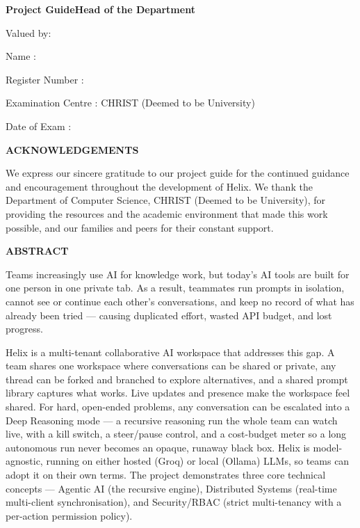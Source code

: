 \documentclass[12pt,a4paper]{report}
\begin{document}
\vspace{0.5in}

\noindent\textbf{Project Guide}\hfill\textbf{Head of the Department}
\vspace{0.4in}

Valued by:

Name :

Register Number :

Examination Centre : CHRIST (Deemed to be University)

Date of Exam :

\clearpage
\begin{center}{\fontsize{16}{19}\selectfont\bfseries ACKNOWLEDGEMENTS}\end{center}

We express our sincere gratitude to our project guide for the continued guidance and encouragement throughout the development of Helix. We thank the Department of Computer Science, CHRIST (Deemed to be University), for providing the resources and the academic environment that made this work possible, and our families and peers for their constant support.

\clearpage
\begin{center}{\fontsize{16}{19}\selectfont\bfseries ABSTRACT}\end{center}

Teams increasingly use AI for knowledge work, but today's AI tools are built for one person in one private tab. As a result, teammates run prompts in isolation, cannot see or continue each other's conversations, and keep no record of what has already been tried --- causing duplicated effort, wasted API budget, and lost progress.

Helix is a multi-tenant collaborative AI workspace that addresses this gap. A team shares one workspace where conversations can be shared or private, any thread can be forked and branched to explore alternatives, and a shared prompt library captures what works. Live updates and presence make the workspace feel shared. For hard, open-ended problems, any conversation can be escalated into a Deep Reasoning mode --- a recursive reasoning run the whole team can watch live, with a kill switch, a steer/pause control, and a cost-budget meter so a long autonomous run never becomes an opaque, runaway black box. Helix is model-agnostic, running on either hosted (Groq) or local (Ollama) LLMs, so teams can adopt it on their own terms. The project demonstrates three core technical concepts --- Agentic AI (the recursive engine), Distributed Systems (real-time multi-client synchronisation), and Security/RBAC (strict multi-tenancy with a per-action permission policy).
\end{document}

